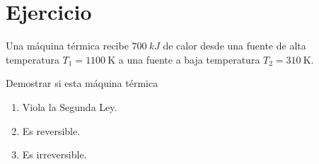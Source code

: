 \section{Ejercicio}\label{ej:Chap07Ejercicio08}
Una máquina térmica recibe $\SI{700}{kJ}$ de calor desde una fuente de alta temperatura $T_1=\SI{1100}{\kelvin}$ a una fuente a baja temperatura $T_2=\SI{310}{\kelvin}$.

Demostrar si esta máquina térmica
\begin{enumerate}
    \item Viola la Segunda Ley.
    \item Es reversible.
    \item Es irreversible.
\end{enumerate}